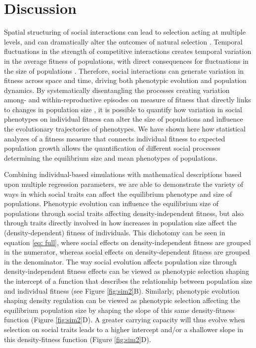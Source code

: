 \documentclass{article}
\begin{document}
\section{Discussion}
Spatial structuring of social interactions can lead to selection acting at multiple levels, and can dramatically alter the outcomes of natural selection \citep{Okasha2004, frank1998foundations, Wolf1999SocialSelection}. Temporal fluctuations in the strength of competitive interactions creates temporal variation in the average fitness of populations, with direct consequences for fluctuations in the size of populations \citep{Gilpin1973a}. Therefore, social interactions can generate variation in fitness across space and time, driving both phenotypic evolution and population dynamics. By systematically disentangling the processes creating variation among- and within-reproductive episodes on measure of fitness that directly links to changes in population size \citep{Saether2015}, it is possible to quantify how variation in social phenotypes on individual fitness can alter the size of populations and influence the evolutionary trajectories of phenotypes. We have shown here how statistical analyzes of a fitness measure that connects individual fitness to expected population growth allows the quantification of different social processes determining the equilibrium size and mean phenotypes of populations.

Combining individual-based simulations with mathematical descriptions based upon multiple regression parameters, we are able to demonstrate the variety of ways in which social traits can affect the equilibrium phenotype and size of populations. Phenotypic evolution can influence the equilibrium size of populations through social traits affecting density-independent fitness, but also through traits directly involved in how increases in population size affect the (density-dependent) fitness of individuals. This dichotomy can be seen in equation \ref{eq: full}, where social effects on density-independent fitness are grouped in the numerator, whereas social effects on density-dependent fitness are grouped in the denominator. The way social evolution affects population size through density-independent fitness effects can be viewed as phenotypic selection shaping the intercept of a function that describes the relationship between population size and individual fitness (see Figure \ref{fig:sim2}B). Similarly, phenotypic evolution shaping density regulation can be viewed as phenotypic selection affecting the equilibrium population size by shaping the slope of this same density-fitness function (Figure \ref{fig:sim2}D). A greater carrying capacity will thus evolve when selection on social traits leads to a higher intercept and/or a shallower slope in this density-fitness function (Figure \ref{fig:sim2}D). 
\end{document}
